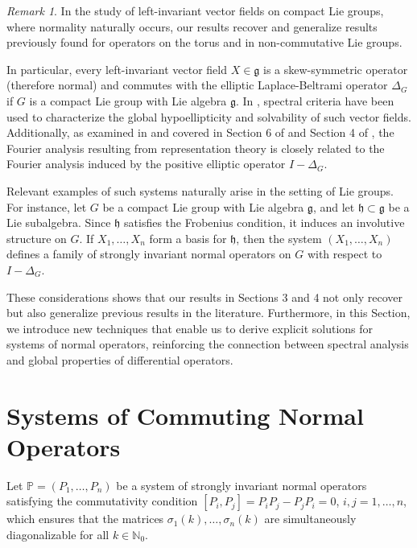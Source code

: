 \documentclass{amsart}
\theoremstyle{definition}
\theoremstyle{remark}
\newtheorem{remark}[theorem]{Remark}
\numberwithin{equation}{section}
\begin{document}
\begin{remark}
	In the study of left-invariant vector fields on compact Lie groups, where normality naturally occurs, our results recover and generalize results previously found for operators on the torus and in non-commutative Lie groups. 
	
	In particular, every left-invariant vector field $X\in\mathfrak{g}$ is a skew-symmetric operator (therefore normal) and commutes with the elliptic Laplace-Beltrami operator $\Delta_G$ if $G$ is a compact Lie group with Lie algebra $\mathfrak{g}$. In \cite{KMR20, KMR20b}, spectral criteria have been used to characterize the global hypoellipticity and solvability of such vector fields. Additionally, as examined in \cite{RuzhTur} and covered in Section 6 of \cite{DR2018} and Section 4 of \cite{KM2020}, the Fourier analysis resulting from representation theory is closely related to the Fourier analysis induced by the positive elliptic operator $I-\Delta_G$. 
	
	Relevant examples of such systems naturally arise in the setting of Lie groups. For instance, let $G$ be a compact Lie group with Lie algebra $\mathfrak{g}$, and let $\mathfrak{h} \subset \mathfrak{g}$ be a Lie subalgebra. Since $\mathfrak{h}$ satisfies the Frobenius condition, it induces an involutive structure on $G$. If $X_1, \dots, X_n$ form a basis for $\mathfrak{h}$, then the system $(X_1, \dots, X_n)$ defines a family of strongly invariant normal operators on $G$ with respect to $I - \Delta_G$.  

	These considerations shows that our results in Sections 3 and 4 not only recover but also generalize previous results in the literature. Furthermore,  in this Section, we introduce new techniques that enable us to derive explicit solutions for systems of normal operators, reinforcing the connection between spectral analysis and global properties of differential operators.
\end{remark}



\section{Systems of Commuting Normal Operators}

Let $\mathbb{P}=(P_1,\dots,P_n)$ be a system of strongly invariant normal operators satisfying the commutativity condition $	[P_i,P_j] = P_iP_j - P_jP_i = 0$, $i,j=1,\dots,n$, which ensures that the matrices $\sigma_1(k),\dots,\sigma_n(k)$ are simultaneously diagonalizable for all $k\in\mathbb{N}_0$.  
\end{document}
